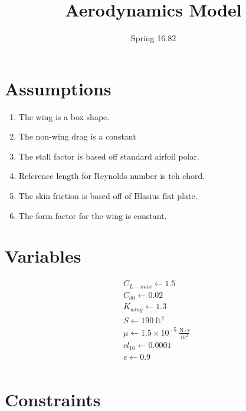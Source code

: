 \documentclass[10pt, a4paper]{article}
\begin{document}
\title{Aerodynamics Model}
\author{Spring 16.82}
\maketitle

\section*{Assumptions} 

\begin{enumerate}

\item The wing is a box shape. 
\item The non-wing drag is a constant
\item The stall factor is based off standard airfoil polar.
\item Reference length for Reynolds number is teh chord.
\item The skin friction is based off of Blasius flat plate.
\item The form factor for the wing is constant. 

\end{enumerate}

\section*{Variables}

\[\begin{array}{ll}
	& C_{L-max} \gets 1.5 \\
	& C_{d0} \gets 0.02 \\
	& K_{wing} \gets 1.3 \\
	& S \gets 190~\mathrm{ft^{2}} \\
	& \mu \gets 1.5 \times 10^{-5}~\mathrm{\tfrac{N\cdot s}{m^{2}}} \\
	& cl_{16} \gets 0.0001 \\
	& e \gets 0.9 \\
\end{array} \]

\section*{Constraints}
\end{document}

